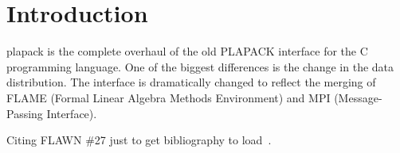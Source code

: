 \chapter{Introduction}
\label{chapter:intro}

plapack is the complete overhaul of the old PLAPACK interface 
for the C programming language.
One of the biggest differences is the change in the data
distribution.  The interface is dramatically changed to reflect
the merging of FLAME (Formal Linear Algebra Methods Environment) 
and MPI (Message-Passing Interface).

Citing FLAWN \#27 just to get bibliography to load~\cite{FLAWN27}.
